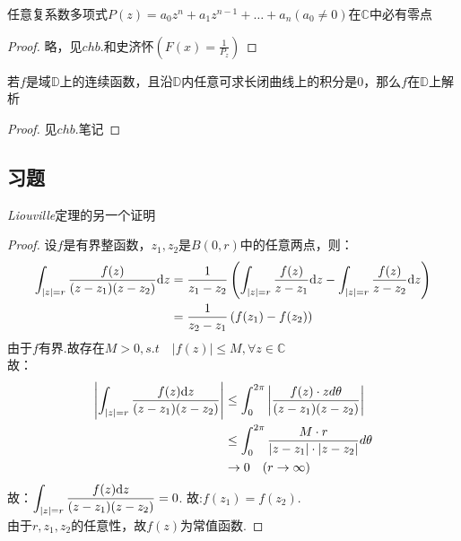 \begin{theorem}[代数基本定理]
	任意复系数多项式$P(z)=a_{0}z^{n}+a_{1}z^{n-1}+\dots+a_{n}$\quad$(a_{0}\neq0)$在$\mathbb{C}$中必有零点
\end{theorem}
\begin{proof}
	略，见$chb.$和史济怀\quad$\displaystyle{(F(x)=\frac{1}{P_{z}})}$
\end{proof}

\begin{theorem}
	若$f$是域$\mathbb{D}$上的连续函数，且沿$\mathbb{D}$内任意可求长闭曲线上的积分是0，那么$f$在$\mathbb{D}$上解析
\end{theorem}
\begin{proof}
	见$chb.$笔记
\end{proof}

\subsection*{习题}
\begin{eg}
	\emph{Liouville}定理的另一个证明
\end{eg}
\begin{proof}
	设$f$是有界整函数，$z_{1},z_{2}$是$B(0,r)$中的任意两点，则：
	\begin{align*}
	\int_{|z|=r}\frac{f(z)}{(z-z_1)(z-z_2)}\mathrm{d}z
	&=\frac{1}{z_1-z_2}
	\left(\int_{|z|=r}\frac{f(z)}{z-z_1}\mathrm{d}z-\int_{|z|=r}\frac{f(z)}{z-z_2}\mathrm{d}z\right)\\
	&=\frac{1}{z_2-z_1}\left(f(z_1)-f(z_2)\right)
	\end{align*}
	由于$f$有界.故存在$M>0,s.t\quad|f(z)|\leq M,\forall z\in \mathbb{C}$\\
	故：
	\begin{align*}
	\left|\int_{|z|=r}\frac{f(z)\mathrm{d}z}{(z-z_1)(z-z_2)}\right|
	&\leq\int_0^{2\pi}\left|\frac{f(z)\cdot zd\theta}{(z-z_1)(z-z_2)}\right|\\
	&\leq\int_0^{2\pi}\frac{M\cdot r}{|z-z_1|\cdot|z-z_2|}d\theta\\
	&\rightarrow 0\quad(r\rightarrow\infty)
	\end{align*}
	故：$\displaystyle{\int_{|z|=r}\frac{f(z)\mathrm{d}z}{(z-z_1)(z-z_2)}=0}$. \quad 故:$\displaystyle{f(z_1)=f(z_2)}$.\\
	由于$r,z_1,z_2$的任意性，故$f(z)$为常值函数.
\end{proof}

